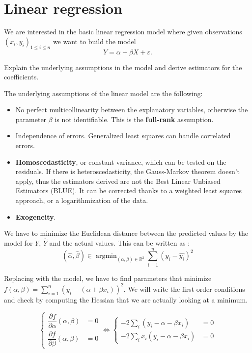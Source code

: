 \section{Linear regression}

\begin{tcolorbox}[width=\linewidth, sharp corners=all, colback=white!95!black]
We are interested in the basic linear regression model where given observations $(x_i, y_i)_{1\leq i \leq n}$ we want to build the model $$Y = \alpha + \beta X + \varepsilon.$$

Explain the underlying assumptions in the model and derive estimators for the coefficients.

\end{tcolorbox}

The underlying assumptions of the linear model are the following:

\begin{itemize}
    \item No perfect multicollinearity between the explanatory variables, otherwise the parameter $\beta$ is not identifiable. This is the \textbf{full-rank} assumption.
    \item Independence of errors. Generalized least squares can handle correlated errors.
    \item \textbf{Homoscedasticity}, or constant variance, which can be tested on the residuals. If there is heteroscedasticity, the Gauss-Markov theorem doesn't apply, thus the estimators derived are not the Best Linear Unbiased Estimators (BLUE). It can be corrected thanks to a weighted least squares approach, or a logarithmization of the data.
    \item \textbf{Exogeneity}.
\end{itemize}

We have to minimize the Euclidean distance between the predicted values by the model for $Y$, $\hat{Y}$ and the actual values. This can be written as :
$$(\hat{\alpha}, \hat{\beta}) \in \operatorname{argmin}_{(\alpha, \beta) \in \mathbb{R}^2} \displaystyle \sum_{i=1}^{n} (y_i - \hat{y_i})^2$$

Replacing with the model, we have to find parameters that minimize $f(\alpha, \beta) = \displaystyle \sum_{i=1}^{n} (y_i - (\alpha + \beta x_i))^2.$ We will write the first order conditions and check by computing the Hessian that we are actually looking at a minimum.

$$\left\{\begin{array}{ll}
        \dfrac{\partial f}{\partial \alpha}(\alpha, \beta) &= 0 \\
        \dfrac{\partial f}{\partial \beta}(\alpha, \beta) &= 0
    \end{array}\right. \Leftrightarrow 
\left\{\begin{array}{ll}
        -2\sum_i (y_i - \alpha - \beta x_i) &= 0 \\
        -2\sum_i x_i (y_i - \alpha - \beta x_i) &= 0
    \end{array}\right.$$

